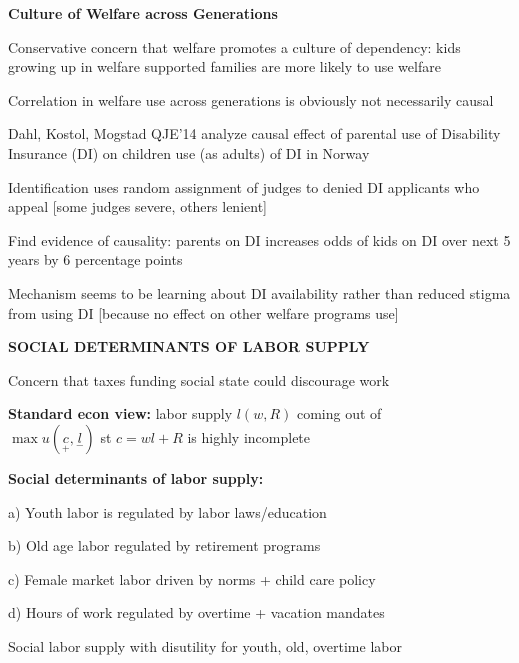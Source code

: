 \documentclass[landscape]{slides}
\begin{document}
\begin{slide}
\begin{center}
{\bf Culture of Welfare across Generations}
\end{center}
Conservative concern that welfare promotes a culture of dependency: kids growing up
in welfare supported families are more likely to use welfare

Correlation in welfare use across generations is obviously not necessarily causal 

Dahl, Kostol, Mogstad QJE'14 analyze causal effect of parental use of Disability Insurance (DI)
on children use (as adults) of DI in Norway

Identification uses random assignment of judges to denied DI applicants who appeal [some judges severe, others
lenient] 

Find evidence of causality: parents on DI increases odds of kids on DI over next 5 years by 6 percentage points

\small
Mechanism seems to be learning about DI availability rather than reduced stigma from using DI [because no effect on other
welfare programs use]

\end{slide}

\begin{slide}

\end{slide}


\begin{slide}
\begin{center}
{\bf SOCIAL DETERMINANTS OF LABOR SUPPLY}
\end{center}
Concern that taxes funding social state could discourage work

\textbf{Standard econ view:} labor supply $l(w,R)$ coming out of \\ $\max u(\underset{+}{c},\underset{-}{l})$ st $c=wl+R$
is highly incomplete

\textbf{Social determinants of labor supply:}

a) Youth labor is regulated by labor laws/education

b) Old age labor regulated by retirement programs

c) Female market labor driven by norms + child care policy

d) Hours of work regulated by overtime + vacation mandates

Social labor supply with disutility for youth, old, overtime labor

\end{slide}
\end{document}
